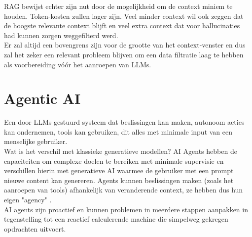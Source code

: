 RAG bewijst echter zijn nut door de mogelijkheid om de context miniem te houden. Token-kosten zullen lager zijn. Veel minder context wil ook zeggen dat de hoogste relevante context blijft en veel extra context dat voor hallucinaties had kunnen zorgen weggefilterd werd. \\

Er zal altijd een bovengrens zijn voor de grootte van het context-venster en dus zal het zeker een relevant probleem blijven om een data filtratie laag te hebben als voorbereiding vóór het aanroepen van LLMs.

\section{Agentic AI}
\label{sec:agenticai}
Een door LLMs gestuurd systeem dat beslissingen kan maken, autonoom acties kan ondernemen, tools kan gebruiken, dit alles met minimale input van een menselijke gebruiker. \\

Wat is het verschil met klassieke generatieve modellen? AI Agents hebben de capaciteiten om complexe doelen te bereiken met minimale supervisie en verschillen hierin met generatieve AI waarmee de gebruiker met een prompt nieuwe content kan genereren. Agents kunnen beslissingen maken (zoals het aanroepen van tools) afhankelijk van veranderende context, ze hebben dus hun eigen "agency" \autocite{IBMd}. \\

AI agents zijn proactief en kunnen problemen in meerdere stappen aanpakken in tegenstelling tot een reactief calculerende machine die simpelweg gekregen opdrachten uitvoert. \\


